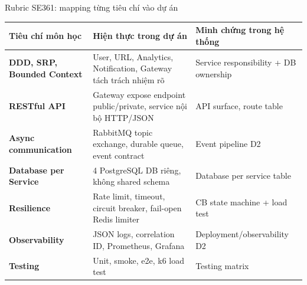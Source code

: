 \documentclass[aspectratio=169]{beamer}
\begin{document}
\begin{frame}{Rubric SE361: mapping từng tiêu chí vào dự án}
    \scriptsize
    \begin{center}
    \begin{tabular}{>{\bfseries}p{}p{}p{}}
        \toprule
        Tiêu chí môn học & Hiện thực trong dự án & Minh chứng trong hệ thống \\
        \midrule
        DDD, SRP, Bounded Context & User, URL, Analytics, Notification, Gateway tách trách nhiệm rõ & Service responsibility + DB ownership \\
        RESTful API & Gateway expose endpoint public/private, service nội bộ HTTP/JSON & API surface, route table \\
        Async communication & RabbitMQ topic exchange, durable queue, event contract & Event pipeline D2 \\
        Database per Service & 4 PostgreSQL DB riêng, không shared schema & Database per service table \\
        Resilience & Rate limit, timeout, circuit breaker, fail-open Redis limiter & CB state machine + load test \\
        Observability & JSON logs, correlation ID, Prometheus, Grafana & Deployment/observability D2 \\
        Testing & Unit, smoke, e2e, k6 load test & Testing matrix \\
        \bottomrule
    \end{tabular}
    \end{center}
\end{frame}
\end{document}
